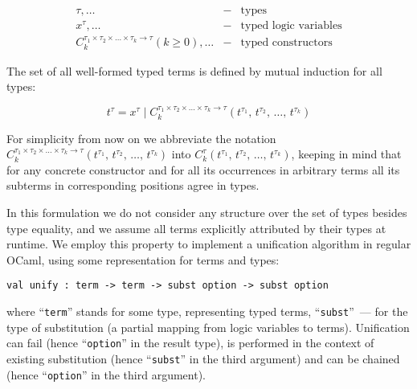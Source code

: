 $$
\begin{array}{rcl}
  \tau,\dots&-&\mbox{types}\\
  x^\tau,\dots&-&\mbox{typed logic variables}\\
  C_k^{\tau_1\times\tau_2\times\dots\times\tau_k\to\tau} (k\ge 0),\dots&-&\mbox{typed constructors}
\end{array}
$$

The set of all well-formed typed terms is defined by mutual induction for all types:

$$
t^\tau=x^\tau\mid C_k^{\tau_1\times\tau_2\times\dots\times\tau_k\to\tau}(t^{\tau_1},\,t^{\tau_2},\,\dots,\,t^{\tau_k})
$$

For simplicity from now on we abbreviate the notation $C_k^{\tau_1\times\tau_2\times\dots\times\tau_k\to\tau}(t^{\tau_1},\,t^{\tau_2},\,\dots,\,t^{\tau_k})$ into 
$C_k^\tau(t^{\tau_1},\,t^{\tau_2},\,\dots,\,t^{\tau_k})$, keeping in mind that for any concrete constructor and for all its occurrences 
in arbitrary terms all its subterms in corresponding positions agree in types. 

\begin{comment}
We need also to define the notion of a subterm  $t^\tau[p]$ of a term $t^\tau$ at given position $p$:

$$
\begin{array}{rcl}
 p=\epsilon\mid\{1, 2, 3,\dots\}\bullet p&-&\mbox{the set of positions}\\
 t^\tau[\epsilon]=t^\tau&-&\mbox{base case}\\
 C_k^\tau(t_1^{\tau_1},\,t_2^{\tau_2},\dots,\,t_k^{\tau_k})[i\bullet p]=t_i^{\tau_i}[p], 1\le i \le k&-&\mbox{inductive case}
\end{array}
$$
\end{comment}

In this formulation we do not consider any structure over the set of types besides type equality, and we assume all terms explicitly 
attributed by their types at runtime. We employ this property to implement a unification algorithm in regular OCaml, using some
representation for terms and types:

\begin{lstlisting}[mathescape=true]
    val unify : term -> term -> subst option -> subst option
\end{lstlisting}

\noindent where ``\lstinline{term}'' stands for some type, representing typed terms, ``\lstinline{subst}''~--- for the type of 
substitution (a partial mapping from logic variables to terms). Unification can fail (hence ``\lstinline{option}'' in the result type), 
is performed in the context of existing substitution (hence ``\lstinline{subst}'' in the third argument) and can be 
chained (hence ``\lstinline{option}'' in the third argument). 

